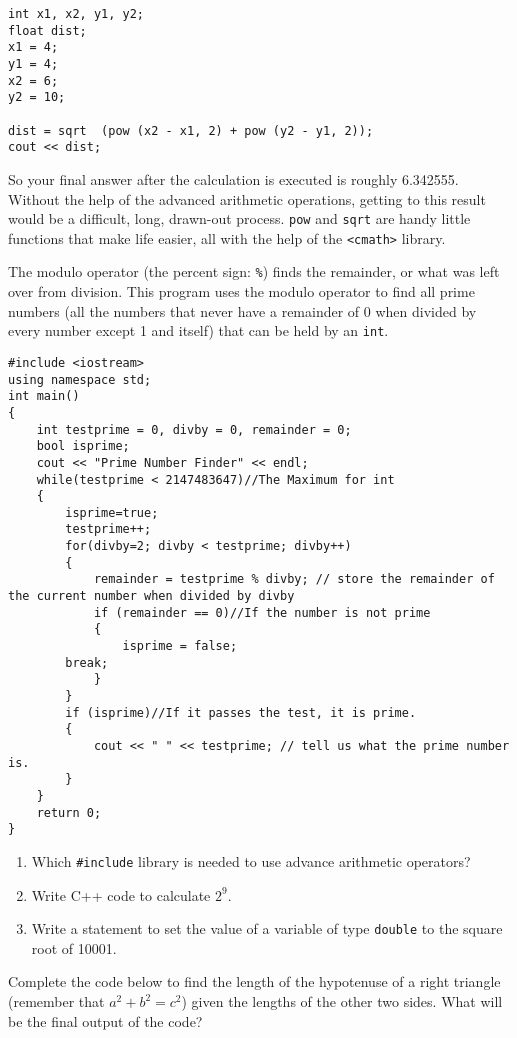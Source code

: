 \begin{lstlisting}
int x1, x2, y1, y2;
float dist;
x1 = 4;
y1 = 4;
x2 = 6;
y2 = 10;

dist = sqrt  (pow (x2 - x1, 2) + pow (y2 - y1, 2));
cout << dist;
\end{lstlisting}
	
	So your final answer after the calculation is executed is roughly 6.342555. 
	Without the help of the advanced arithmetic operations, getting to this result would be a difficult, long, drawn-out process. 
	\texttt{pow} and \texttt{sqrt} are handy little functions that make life easier, all with the help of the \texttt{<cmath>} library.

The modulo operator (the percent sign: \texttt{\%}) finds the remainder, or what was left over from division. 
This program uses the modulo operator to find all prime numbers (all the numbers that never have a remainder of 0 when divided by every number except 1 and itself) that can be held by an \texttt{int}.

\begin{lstlisting}
#include <iostream>
using namespace std;
int main()
{
	int testprime = 0, divby = 0, remainder = 0;
	bool isprime;
	cout << "Prime Number Finder" << endl;
	while(testprime < 2147483647)//The Maximum for int
	{
    	isprime=true;
    	testprime++;
    	for(divby=2; divby < testprime; divby++)
    	{
        	remainder = testprime % divby; // store the remainder of the current number when divided by divby
        	if (remainder == 0)//If the number is not prime
        	{
            	isprime = false;
		break;
        	}
    	}
    	if (isprime)//If it passes the test, it is prime.
    	{
        	cout << " " << testprime; // tell us what the prime number is.
    	}
	}
	return 0;
}
\end{lstlisting}

\begin{enumerate}
\item Which \texttt{\#include} library is needed to use advance arithmetic operators?

\item Write C++ code to calculate $2^9$.

\item Write a statement to set the value of a variable of type \texttt{double} to the square root of 10001.
\end{enumerate}
Complete the code below to find the length of the hypotenuse of a right triangle (remember that $a^2 + b^2 = c^2$) given the lengths of the other two sides. What will be the final output of the code?

